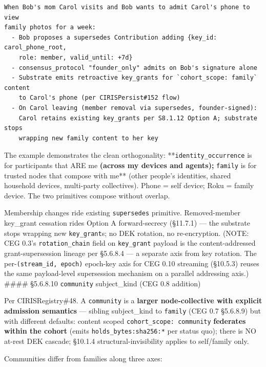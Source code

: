 \documentclass[11pt]{article}
\begin{document}
\begin{lstlisting}
When Bob's mom Carol visits and Bob wants to admit Carol's phone to view
family photos for a week:
  - Bob proposes a supersedes Contribution adding {key_id: carol_phone_root,
    role: member, valid_until: +7d}
  - consensus_protocol "founder_only" admits on Bob's signature alone
  - Substrate emits retroactive key_grants for `cohort_scope: family` content
    to Carol's phone (per CIRISPersist#152 flow)
  - On Carol leaving (member removal via supersedes, founder-signed):
    Carol retains existing key_grants per S8.1.12 Option A; substrate stops
    wrapping new family content to her key
\end{lstlisting}

The example demonstrates the clean orthogonality: **\texttt{identity\_occurrence} is for participants that ARE me\textbf{ (across my devices and agents); }\texttt{family} is for trusted nodes that compose with me** (other people's identities, shared household devices, multi-party collectives). Phone = self device; Roku = family device. The two primitives compose without overlap.


Membership changes ride existing \texttt{supersedes} primitive. Removed-member key\_grant cessation rides Option A forward-secrecy (§11.7.1) — the substrate stops wrapping new \texttt{key\_grant}s; no DEK rotation, no re-encryption. (NOTE: CEG 0.3's \texttt{rotation\_chain} field on \texttt{key\_grant} payload is the content-addressed grant-supersession lineage per §5.6.8.4 — a separate axis from key rotation. The per-\texttt{(stream\_id, epoch)} epoch-key axis for CEG 0.10 streaming (§10.5.3) reuses the same payload-level supersession mechanism on a parallel addressing axis.) \#\#\#\# §5.6.8.10 \texttt{community} subject\_kind (CEG 0.8 addition)


Per CIRISRegistry\#48. A \texttt{community} is a \textbf{larger node-collective with explicit admission semantics} — sibling subject\_kind to \texttt{family} (CEG 0.7 §5.6.8.9) but with different defaults: content scoped \texttt{cohort\_scope: community} \textbf{federates within the cohort} (emits \texttt{holds\_bytes:sha256:*} per status quo); there is NO at-rest DEK cascade; §10.1.4 structural-invisibility applies to self/family only.


Communities differ from families along three axes:
\end{document}
